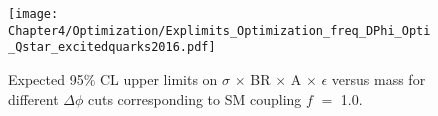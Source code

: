 
\begin{table}[htbp]
  \begin{minipage}{0.54\textwidth}
    \begin{figure}[H]
      \texttt{[image: Chapter4/Optimization/Explimits\_Optimization\_freq\_DPhi\_Opti\_Qstar\_excitedquarks2016.pdf]}
      \caption{Expected 95$\%$ CL upper limits on $\sigma$ $\times$ BR $\times$ A $\times$ $\epsilon$ versus \qstar mass
        for different ${\Delta}{\phi}$ cuts corresponding to SM coupling $f$ $=$ 1.0.}
      \label{fig:DPhiOpti}
    \end{figure}
  \end{minipage}%
  \hfill
  \begin{minipage}{0.44\textwidth}
    \centering
    \caption{${\Delta}{\phi}$ cut optimization corresponding to different mass expected limits.}
    \label{Table:DPhiOpti}
  \end{minipage}
\end{table}

